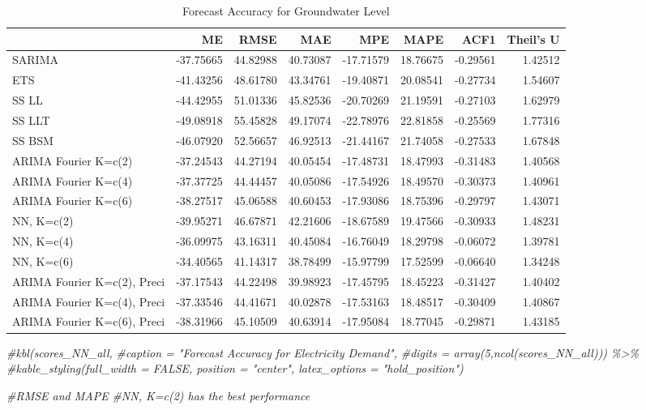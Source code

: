 \documentclass[
]{article}
\newenvironment{Shaded}{\begin{snugshade}}{\end{snugshade}}
\newcommand{\CommentTok}[1]{\textcolor[rgb]{0.56,0.35,0.01}{\textit{#1}}}
\begin{document}
\begin{table}[!h]
\centering
\caption{\label{tab:Accuracy}Forecast Accuracy for Groundwater Level}
\centering
\begin{tabular}[t]{l|r|r|r|r|r|r|r}
\hline
  & ME & RMSE & MAE & MPE & MAPE & ACF1 & Theil's U\\
\hline
SARIMA & -37.75665 & 44.82988 & 40.73087 & -17.71579 & 18.76675 & -0.29561 & 1.42512\\
\hline
ETS & -41.43256 & 48.61780 & 43.34761 & -19.40871 & 20.08541 & -0.27734 & 1.54607\\
\hline
SS LL & -44.42955 & 51.01336 & 45.82536 & -20.70269 & 21.19591 & -0.27103 & 1.62979\\
\hline
SS LLT & -49.08918 & 55.45828 & 49.17074 & -22.78976 & 22.81858 & -0.25569 & 1.77316\\
\hline
SS BSM & -46.07920 & 52.56657 & 46.92513 & -21.44167 & 21.74058 & -0.27533 & 1.67848\\
\hline
ARIMA Fourier K=c(2) & -37.24543 & 44.27194 & 40.05454 & -17.48731 & 18.47993 & -0.31483 & 1.40568\\
\hline
ARIMA Fourier K=c(4) & -37.37725 & 44.44457 & 40.05086 & -17.54926 & 18.49570 & -0.30373 & 1.40961\\
\hline
ARIMA Fourier K=c(6) & -38.27517 & 45.06588 & 40.60453 & -17.93086 & 18.75396 & -0.29797 & 1.43071\\
\hline
NN, K=c(2) & -39.95271 & 46.67871 & 42.21606 & -18.67589 & 19.47566 & -0.30933 & 1.48231\\
\hline
NN, K=c(4) & -36.09975 & 43.16311 & 40.45084 & -16.76049 & 18.29798 & -0.06072 & 1.39781\\
\hline
NN, K=c(6) & -34.40565 & 41.14317 & 38.78499 & -15.97799 & 17.52599 & -0.06640 & 1.34248\\
\hline
ARIMA Fourier K=c(2), Preci & -37.17543 & 44.22498 & 39.98923 & -17.45795 & 18.45223 & -0.31427 & 1.40402\\
\hline
ARIMA Fourier K=c(4), Preci & -37.33546 & 44.41671 & 40.02878 & -17.53163 & 18.48517 & -0.30409 & 1.40867\\
\hline
ARIMA Fourier K=c(6), Preci & -38.31966 & 45.10509 & 40.63914 & -17.95084 & 18.77045 & -0.29871 & 1.43185\\
\hline
\end{tabular}
\end{table}

\begin{Shaded}
\begin{Highlighting}[]
\CommentTok{\#kbl(scores\_NN\_all, }
    \CommentTok{\#caption = "Forecast Accuracy for Electricity Demand",}
    \CommentTok{\#digits = array(5,ncol(scores\_NN\_all))) \%\textgreater{}\%}
  \CommentTok{\#kable\_styling(full\_width = FALSE, position = "center", latex\_options = "hold\_position")}

\CommentTok{\#RMSE and MAPE}
\CommentTok{\#NN, K=c(2) has the best performance}
\end{Highlighting}
\end{Shaded}
\end{document}
